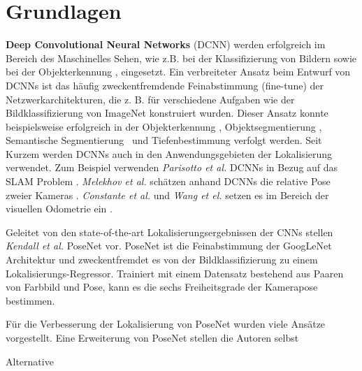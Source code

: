 \pagebreak
\section{Grundlagen}




\pagebreak
\textbf{Deep Convolutional Neural Networks} (DCNN) werden erfolgreich im Bereich des Maschinelles Sehen, wie z.B. bei der Klassifizierung von Bildern \cite{krizhevskyImageNetClassificationDeep2012, simonyanVeryDeepConvolutional2014, heDeepResidualLearning2015} sowie bei der  Objekterkennung \cite{girshickRichFeatureHierarchies2013, renFasterRCNNRealTime2015b, girshickFastRCNN2015},  eingesetzt. 
Ein verbreiteter Ansatz beim Entwurf von DCNNs ist das häufig zweckentfremdende Feinabstimmung (fine-tune) der Netzwerkarchitekturen, die z. B. für verschiedene Aufgaben wie der Bildklassifizierung von ImageNet \cite{russakovskyImageNetLargeScale2014} konstruiert wurden. Dieser Ansatz konnte beispielsweise erfolgreich in der Objekterkennung \cite{girshickFastRCNN2015}, Objektsegmentierung \cite{kokkinosPushingBoundariesBoundary2015, maninisConvolutionalOrientedBoundaries2016}, Semantische Segmentierung \cite{nohLearningDeconvolutionNetwork2015, hazirbasFuseNetIncorporatingDepth2017a} und Tiefenbestimmung \cite{liDepthSurfaceNormal2015} verfolgt werden.
Seit Kurzem werden DCNNs auch in den Anwendungsgebieten der Lokalisierung verwendet. Zum Beispiel verwenden \textit{Parisotto et al.} DCNNs in Bezug auf das SLAM Problem \cite{parisottoGlobalPoseEstimation2018}. \textit{Melekhov et al.} schätzen anhand DCNNs die relative Pose zweier Kameras \cite{melekwashovRelativeCameraPose2017}. \textit{Constante et al.} und \textit{Wang et el.} setzen es im Bereich der visuellen Odometrie ein \cite{costanteExploringRepresentationLearning2016, wangDeepVOEndtoendVisual2017}.

Geleitet von den state-of-the-art Lokalisierungsergebnissen der CNNs stellen \textit{Kendall et al.} PoseNet \cite{kendallPoseNetConvolutionalNetwork2015} vor.
PoseNet ist die Feinabstimmung der GoogLeNet \cite{szegedyGoingDeeperConvolutions2015} Architektur und zweckentfremdet es von der Bildklassifizierung zu einem Lokalisierungs-Regressor. Trainiert mit einem Datensatz bestehend aus Paaren von Farbbild und Pose, kann es die sechs Freiheitsgrade der Kamerapose bestimmen.

Für die Verbesserung der Lokalisierung von PoseNet wurden viele Ansätze vorgestellt. Eine Erweiterung von PoseNet stellen die Autoren selbst


Alternative 





% 
